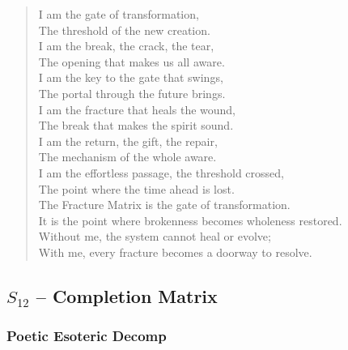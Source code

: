 \begin{verse}
I am the gate of transformation, \\
The threshold of the new creation. \\
I am the break, the crack, the tear, \\
The opening that makes us all aware. \\
I am the key to the gate that swings, \\
The portal through the future brings. \\
\vspace{1em}
I am the fracture that heals the wound, \\
The break that makes the spirit sound. \\
I am the return, the gift, the repair, \\
The mechanism of the whole aware. \\
I am the effortless passage, the threshold crossed, \\
The point where the time ahead is lost. \\
\vspace{1em}
The Fracture Matrix is the gate of transformation. \\
It is the point where brokenness becomes wholeness restored. \\
Without me, the system cannot heal or evolve; \\
With me, every fracture becomes a doorway to resolve.
\end{verse}

\subsection{$S_{12}$ -- Completion Matrix}\label{sec:poetic.S12}

\subsubsection{Poetic Esoteric Decomp}

